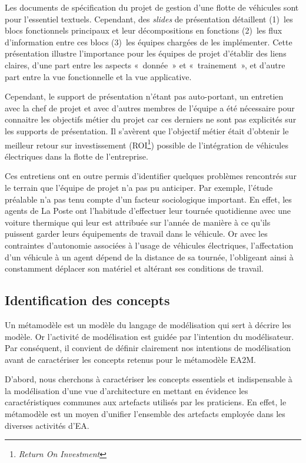 Les documents de spécification du projet de gestion d'une flotte de véhicules
sont pour l'essentiel textuels. Cependant, des \textit{slides} de présentation
détaillent (1)~les blocs fonctionnels principaux et leur décompositions en
fonctions (2)~les flux d'information entre ces blocs (3)~les équipes chargées
de les implémenter. Cette présentation illustre l'importance pour les équipes
de projet d'établir des liens claires, d'une part entre les aspects «~donnée~»
et «~trainement~», et d'autre part entre la vue fonctionnelle et la vue
applicative.

Cependant, le support de présentation n'étant pas auto-portant, un entretien
avec la chef de projet et avec d'autres membres de l'équipe a été nécessaire
pour connaitre les objectifs métier du projet car ces derniers ne sont pas
explicités sur les supports de présentation. Il s'avèrent que l'objectif métier
était d'obtenir le meilleur retour sur investissement
(ROI\footnote{\textit{Return On Investment}}) possible de l'intégration de
véhicules électriques dans la flotte de l'entreprise.

Ces entretiens ont en outre permis d'identifier quelques problèmes rencontrés
sur le terrain que l'équipe de projet n'a pas pu anticiper. Par exemple, l'étude
préalable n'a pas tenu compte d'un facteur sociologique important. En effet,
les agents de La Poste ont l'habitude d'effectuer leur tournée quotidienne avec
une voiture thermique qui leur est attribuée sur l'année de manière à ce qu'ils
puissent garder leurs équipements de travail dans le véhicule. Or avec les
contraintes d'autonomie associées à l'usage de véhicules électriques,
l'affectation d'un véhicule à un agent dépend de la distance de sa tournée,
l'obligeant ainsi à constamment déplacer son matériel et altérant ses
conditions de travail.

\subsection{Identification des concepts}
    
    Un métamodèle est un modèle du langage de modélisation qui sert à décrire les modèle.
    Or l'activité de modélisation est guidée par l’intention du modélisateur.
    Par conséquent, il convient de définir clairement nos intentions de modélisation
    avant de caractériser les concepts retenus pour le métamodèle EA2M.

    D'abord, nous cherchons à caractériser les concepts essentiels et indispensable à la
    modélisation d'une vue d'architecture en mettant en évidence les caractéristiques communes
    aux artefacts utilisés par les praticiens. En effet, le métamodèle est un moyen d'unifier
    l'ensemble des artefacts employée dans les diverses activités d'EA.

